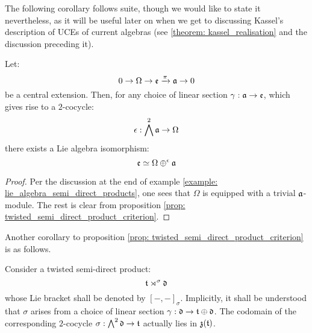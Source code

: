         The following corollary follows suite, though we would like to state it nevertheless, as it will be useful later on when we get to discussing Kassel's description of UCEs of current algebras (see \ref{theorem: kassel_realisation} and the discussion preceding it).
        \begin{corollary} \label{coro: lie_brackets_on_central_extensions}
            Let:
                $$0 \to \Omega \to \mathfrak{e} \xrightarrow[]{\pi} \mathfrak{a} \to 0$$
            be a central extension. Then, for any choice of linear section $\gamma: \mathfrak{a} \to \mathfrak{e}$, which gives rise to a $2$-cocycle:
                $$\epsilon: \bigwedge^2 \mathfrak{a} \to \Omega$$
            there exists a Lie algebra isomorphism:
                $$\mathfrak{e} \simeq \Omega \oplus^{\epsilon} \mathfrak{a}$$
        \end{corollary}
            \begin{proof}
                Per the discussion at the end of example \ref{example: lie_algebra_semi_direct_products}, one sees that $\Omega$ is equipped with a trivial $\mathfrak{a}$-module. The rest is clear from proposition \ref{prop: twisted_semi_direct_product_criterion}.
            \end{proof}
        Another corollary to proposition \ref{prop: twisted_semi_direct_product_criterion} is as follows.
        \begin{corollary} \label{coro: 2_cocycles_are_central}
            Consider a twisted semi-direct product:
                $$\mathfrak{t} \rtimes^{\sigma} \mathfrak{d}$$
            whose Lie bracket shall be denoted by $[-, -]_{\sigma}$. Implicitly, it shall be understood that $\sigma$ arises from a choice of linear section $\gamma: \mathfrak{d} \to \mathfrak{t} \oplus \mathfrak{d}$. The codomain of the corresponding $2$-cocycle $\sigma: \bigwedge^2 \mathfrak{d} \to \mathfrak{t}$ actually lies in $\mathfrak{z}(\mathfrak{t})$.
        \end{corollary}
